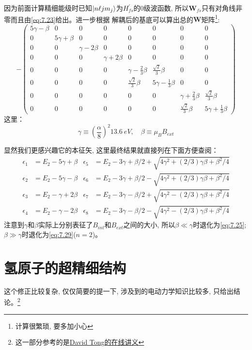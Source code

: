 \documentclass[a4paper,zihao=-4,linespread=1]{ctexrep}
\begin{document}
    因为前面计算精细能级时已知$\ket{n\ell j m_j}$为$H_{fs}^\prime$的0级波函数, 所以$\mathbf{W}_{fs}$只有对角线非零而且由\ref{eq:7.23}给出。进一步根据
    解耦后的基底可以算出总的$\mathbf{W}$矩阵\footnote{计算很繁琐, 要多加小心}:
    \begin{equation*}
        -\left(\begin{array}{cccccccc}
        5 \gamma-\beta & 0 & 0 & 0 & 0 & 0 & 0 & 0 \\
        0 & 5 \gamma+\beta & 0 & 0 & 0 & 0 & 0 & 0 \\
        0 & 0 & \gamma-2 \beta & 0 & 0 & 0 & 0 & 0 \\
        0 & 0 & 0 & \gamma+2 \beta & 0 & 0 & 0 & 0 \\
        0 & 0 & 0 & 0 & \gamma-\frac{2}{3} \beta & \frac{\sqrt{2}}{3} \beta & 0 & 0 \\
        0 & 0 & 0 & 0 & \frac{\sqrt{2}}{3} \beta & 5 \gamma-\frac{1}{3} \beta & 0 & 0 \\
        0 & 0 & 0 & 0 & 0 & 0 & \gamma+\frac{2}{3} \beta & \frac{\sqrt{2}}{3} \beta \\
        0 & 0 & 0 & 0 & 0 & 0 & \frac{\sqrt{2}}{3} \beta & 5 \gamma+\frac{1}{3} \beta
        \end{array}\right)
    \end{equation*}
    这里：\[\gamma\equiv\left(\frac{\alpha}{8}\right)^2\SI{13.6}{eV},\quad \beta\equiv\mu_BB_{ext}\]

    显然我们更感兴趣它的本征矢, 这里最终结果就直接列在下面方便查阅：
    \begin{align*}
        \epsilon_{1} &=E_{2}-5 \gamma+\beta& \epsilon_{5} &=E_{2}-3 \gamma+\beta / 2+\sqrt{4 \gamma^{2}+(2 / 3) \gamma \beta+\beta^{2} / 4} \\
        \epsilon_{2} &=E_{2}-5 \gamma-\beta& \epsilon_{6} &=E_{2}-3 \gamma+\beta / 2-\sqrt{4 \gamma^{2}+(2 / 3) \gamma \beta+\beta^{2} / 4} \\
        \epsilon_{3} &=E_{2}-\gamma+2 \beta& \epsilon_{7} &=E_{2}-3 \gamma-\beta / 2+\sqrt{4 \gamma^{2}-(2 / 3) \gamma \beta+\beta^{2} / 4}\\
        \epsilon_{4} &=E_{2}-\gamma-2 \beta& \epsilon_{8} &=E_{2}-3 \gamma-\beta / 2-\sqrt{4 \gamma^{2}-(2 / 3) \gamma \beta+\beta^{2} / 4}
    \end{align*}
    注意到$\gamma$和$\beta$实际上分别表征了$B_{int}$和$B_{ext}$之间的大小, 所以$\beta\ll\gamma$时退化为\ref{eq:7.25};$\beta\gg\gamma$时退化为\ref{eq:7.29}($n=2$)。
    \section{氢原子的超精细结构}
    这个修正比较复杂, 仅仅简要的提一下, 涉及到的电动力学知识比较多, 只给出结论。\footnote{这一部分参考的是\href{http://www.damtp.cam.ac.uk/user/tong/topicsinqm.html}{David Tong的在线讲义}}
\end{document}
